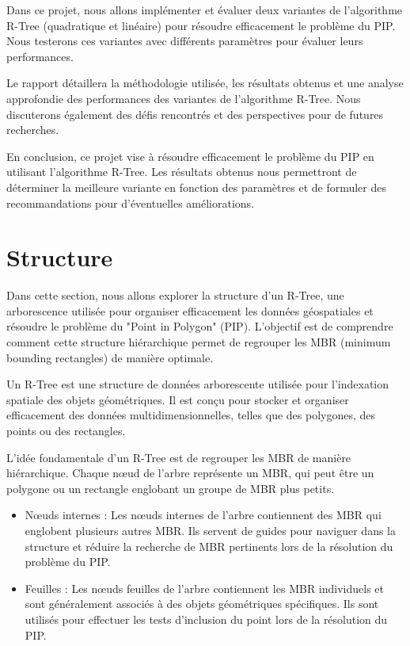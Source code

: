 \documentclass {article}
\begin{document}
Dans ce projet, nous allons implémenter et évaluer deux variantes de l'algorithme R-Tree (quadratique et linéaire) 
pour résoudre efficacement le problème du PIP. Nous testerons ces variantes avec différents paramètres pour 
évaluer leurs performances.

Le rapport détaillera la méthodologie utilisée, les résultats obtenus et une analyse approfondie des performances 
des variantes de l'algorithme R-Tree. Nous discuterons également des défis rencontrés et des perspectives pour de 
futures recherches.


En conclusion, ce projet vise à résoudre efficacement le problème du PIP en utilisant l'algorithme 
R-Tree. 
Les résultats obtenus nous permettront de déterminer la meilleure variante en fonction des 
paramètres et de formuler des recommandations pour d'éventuelles améliorations.

\section {Structure}

Dans cette section, nous allons explorer la structure d'un R-Tree, une arborescence utilisée 
pour organiser efficacement les données géospatiales et résoudre le problème du 
"Point in Polygon" (PIP). L'objectif est de comprendre comment cette structure hiérarchique 
permet de regrouper les MBR (minimum bounding rectangles) de manière optimale.

Un R-Tree est une structure de données arborescente utilisée pour l'indexation spatiale des 
objets géométriques. Il est conçu pour stocker et organiser efficacement des données 
multidimensionnelles, telles que des polygones, des points ou des rectangles.

L'idée fondamentale d'un R-Tree est de regrouper les MBR de manière hiérarchique. 
Chaque nœud de l'arbre représente un MBR, qui peut être un polygone ou un rectangle englobant 
un groupe de MBR plus petits.
\begin{itemize}

    \item Nœuds internes : Les nœuds internes de l'arbre contiennent des MBR qui englobent 
	plusieurs autres MBR. 
	Ils servent de guides pour naviguer dans la structure et réduire la recherche de MBR 
	pertinents lors de la résolution du problème du PIP.

    \item Feuilles : Les nœuds feuilles de l'arbre contiennent les MBR individuels et sont 
	généralement associés à des objets géométriques spécifiques. 
	Ils sont utilisés pour effectuer les tests d'inclusion du point lors de	la résolution 
	du PIP.
\end{itemize}
\end{document}
